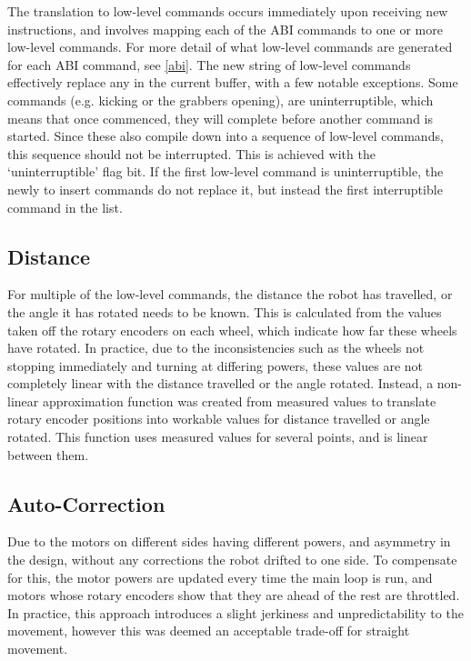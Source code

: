 The translation to low-level commands occurs immediately upon receiving new
instructions, and involves mapping each of the ABI commands to one or more
low-level commands. For more detail of what low-level commands are generated
for each ABI command, see \cref{abi}. The new string of low-level commands
effectively replace any in the current buffer, with a few notable exceptions.
Some commands (e.g. kicking or the grabbers opening), are uninterruptible,
which means that once commenced, they will complete before another command is
started. Since these also compile down into a sequence of low-level commands,
this sequence should not be interrupted. This is achieved with the
`uninterruptible' flag bit. If the first low-level command is uninterruptible,
the newly to insert commands do not replace it, but instead the first
interruptible command in the list.

\subsection{Distance}

For multiple of the low-level commands, the distance the robot has travelled,
or the angle it has rotated needs to be known. This is calculated from the
values taken off the rotary encoders on each wheel, which indicate how far
these wheels have rotated. In practice, due to the inconsistencies such as the
wheels not stopping immediately and turning at differing powers, these values
are not completely linear with the distance travelled or the angle rotated.
Instead, a non-linear approximation function was created from measured values
to translate rotary encoder positions into workable values for distance
travelled or angle rotated. This function uses measured values for several
points, and is linear between them.

\subsection{Auto-Correction}

Due to the motors on different sides having different powers, and asymmetry in
the design, without any corrections the robot drifted to one side. To
compensate for this, the motor powers are updated every time the main loop is
run, and motors whose rotary encoders show that they are ahead of the rest are
throttled. In practice, this approach introduces a slight jerkiness and
unpredictability to the movement, however this was deemed an acceptable
trade-off for straight movement.
